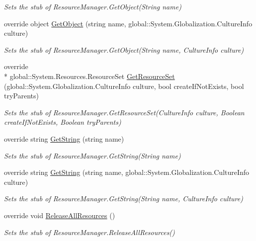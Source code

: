 \begin{DoxyCompactItemize}
\begin{DoxyCompactList}\small\item\em Sets the stub of Resource\-Manager.\-Get\-Object(\-String name)\end{DoxyCompactList}\item 
override object \hyperlink{class_system_1_1_component_model_1_1_fakes_1_1_stub_component_resource_manager_ad19ba5ce44c36f563388bd883c65bbdf}{Get\-Object} (string name, global\-::\-System.\-Globalization.\-Culture\-Info culture)
\begin{DoxyCompactList}\small\item\em Sets the stub of Resource\-Manager.\-Get\-Object(\-String name, Culture\-Info culture)\end{DoxyCompactList}\item 
override \\*
global\-::\-System.\-Resources.\-Resource\-Set \hyperlink{class_system_1_1_component_model_1_1_fakes_1_1_stub_component_resource_manager_a6744981eeb940aa047307fa4fcc127a1}{Get\-Resource\-Set} (global\-::\-System.\-Globalization.\-Culture\-Info culture, bool create\-If\-Not\-Exists, bool try\-Parents)
\begin{DoxyCompactList}\small\item\em Sets the stub of Resource\-Manager.\-Get\-Resource\-Set(\-Culture\-Info culture, Boolean create\-If\-Not\-Exists, Boolean try\-Parents)\end{DoxyCompactList}\item 
override string \hyperlink{class_system_1_1_component_model_1_1_fakes_1_1_stub_component_resource_manager_a725b8a8263258da48d9d2696a31a6745}{Get\-String} (string name)
\begin{DoxyCompactList}\small\item\em Sets the stub of Resource\-Manager.\-Get\-String(\-String name)\end{DoxyCompactList}\item 
override string \hyperlink{class_system_1_1_component_model_1_1_fakes_1_1_stub_component_resource_manager_a26d200038c1809dd68bcfa196cce6284}{Get\-String} (string name, global\-::\-System.\-Globalization.\-Culture\-Info culture)
\begin{DoxyCompactList}\small\item\em Sets the stub of Resource\-Manager.\-Get\-String(\-String name, Culture\-Info culture)\end{DoxyCompactList}\item 
override void \hyperlink{class_system_1_1_component_model_1_1_fakes_1_1_stub_component_resource_manager_a72c43f3d7809b56997288e1ba07f3670}{Release\-All\-Resources} ()
\begin{DoxyCompactList}\small\item\em Sets the stub of Resource\-Manager.\-Release\-All\-Resources()\end{DoxyCompactList}\end{DoxyCompactItemize}
